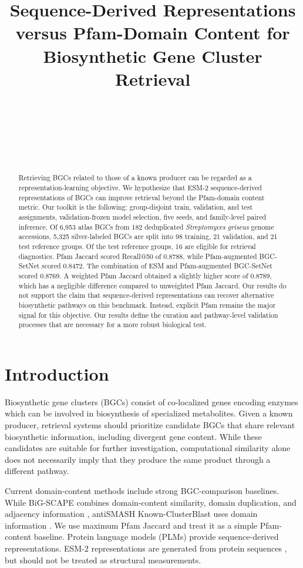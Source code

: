 \documentclass{article}
\title{Sequence-Derived Representations versus Pfam-Domain Content for Biosynthetic Gene Cluster Retrieval}
\author{\makebox[\textwidth][c]{\textbf{Rustambek Urokov} \qquad \textbf{Asifullah Khan} \qquad \textbf{Farhod Eshboyev}}\\[0.3em]
  \makebox[\textwidth][c]{\textbf{Dovud Asadov} \qquad \textbf{Sejuti Rahman} \qquad \textbf{Dilafruz Kushokova}}\\[0.5em]
  \makebox[\textwidth][c]{New Uzbekistan University, Tashkent, Uzbekistan}\\[0.3em]
  \makebox[\textwidth][c]{\texttt{\{r.urokov, f.eshboev, d.asadov, s.rahman, d.qoshoqova\}@newuu.uz}}\\
  \makebox[\textwidth][c]{\texttt{asif@awkum.edu.pk}}\\[0.3em]
  }
\begin{document}
\maketitle

\begin{abstract}
Retrieving BGCs related to those of a known producer can be regarded as a representation-learning objective. We hypothesize that ESM-2 sequence-derived representations of BGCs can improve retrieval beyond the Pfam-domain content metric. Our toolkit is the following: group-disjoint train, validation, and test assignments, validation-frozen model selection, five seeds, and family-level paired inference. Of 6,953 atlas BGCs from 182 deduplicated \textit{Streptomyces griseus} genome accessions, 5,325 silver-labeled BGCs are split into 98 training, 21 validation, and 21 test reference groups. Of the test reference groups, 16 are eligible for retrieval diagnostics. Pfam Jaccard scored Recall@50 of 0.8788, while Pfam-augmented BGC-SetNet scored 0.8472. The combination of ESM and Pfam-augmented BGC-SetNet scored 0.8769. A weighted Pfam Jaccard obtained a slightly higher score of 0.8789, which has a negligible difference compared to unweighted Pfam Jaccard. Our results do not support the claim that sequence-derived representations can recover alternative biosynthetic pathways on this benchmark. Instead, explicit Pfam remains the major signal for this objective.  Our results define the curation and pathway-level validation processes that are necessary for a more robust biological test.
\end{abstract}

\section{Introduction}

Biosynthetic gene clusters (BGCs) consist of co-localized genes encoding enzymes which can be involved in biosynthesis of specialized metabolites. Given a known producer, retrieval systems should prioritize candidate BGCs that share relevant biosynthetic information, including divergent gene content. While these candidates are suitable for further investigation, computational similarity alone does not necessarily imply that they produce the same product through a different pathway.



Current domain-content methods include strong BGC-comparison baselines. While BiG-SCAPE combines domain-content similarity, domain duplication, and adjacency information \cite{navarro2020}, antiSMASH Known-ClusterBlast uses domain information \cite{blin2021}. We use maximum Pfam Jaccard and treat it as a simple Pfam-content baseline. Protein language models (PLMs) provide sequence-derived representations. ESM-2 representations are generated from protein sequences \cite{lin2023}, but should not be treated as structural measurements.
\end{document}

